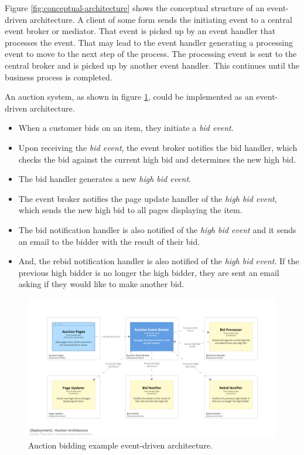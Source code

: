 Figure \ref{fig:conceptual-architecture} shows the conceptual structure of an event-driven architecture.
A client of some form sends the initiating event to a central event broker or mediator.
That event is picked up by an event handler that processes the event.
That may lead to the event handler generating a processing event to move to the next step of the process.
The processing event is sent to the central broker and is picked up by another event handler.
This continues until the business process is completed.

\filbreak
An auction system, as shown in figure \ref{fig:auction-architecture}, could be implemented as an event-driven architecture.
\begin{itemize}[topsep=2pt,partopsep=1pt,itemsep=1pt,parsep=1pt]
    \item When a customer bids on an item, they initiate a \textit{bid event}.
    \item Upon receiving the \textit{bid event}, the event broker notifies the bid handler, which checks the bid against the current high bid and determines the new high bid.
    \item The bid handler generates a new \textit{high bid event}.
    \item The event broker notifies the page update handler of the \textit{high bid event}, which sends the new high bid to all pages displaying the item.
    \item The bid notification handler is also notified of the \textit{high bid event} and it sends an email to the bidder with the result of their bid.
    \item And, the rebid notification handler is also notified of the \textit{high bid event}.
          If the previous high bidder is no longer the high bidder, they are sent an email asking if they would like to make another bid.
\end{itemize}

\begin{figure}[h!]
    \begin{adjustwidth}{-10mm}{-10mm}
        \centering
        \includegraphics[trim=195 195 195 195,clip,width=0.95\paperwidth]{diagrams/auction-architecture.png}
    \end{adjustwidth}
    \caption{Auction bidding example event-driven architecture.}
    \label{fig:auction-architecture}
\end{figure}

